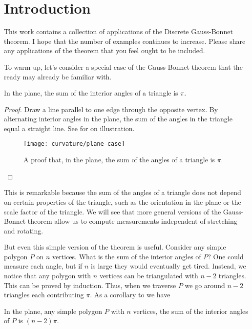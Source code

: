 \section{Introduction}
\label{sec:intro}

This work contains a collection of applications of the 
Discrete Gauss-Bonnet theorem.
I hope that the number of examples continues to increase.
Please share any applications of the theorem that you feel
ought to  be included.


To warm up, let's consider a special case of the Gauss-Bonnet
theorem that the ready may already be familiar with.
\begin{theorem}\label{thm:triangle}
In the plane, the sum of the interior angles of a triangle is $\pi$.
\end{theorem}
\begin{proof}
Draw a line parallel to one edge through the opposite vertex.
By alternating interior angles in the plane, the sum of the angles
in the triangle equal  a straight line.
See  for on illustration. 



\begin{figure}[htb]
\centering
\texttt{[image: curvature/plane-case]}
\caption{A proof that, in the plane, the sum of the angles of a triangle is $\pi$.}
\label{fig:angles}
\end{figure}

\end{proof}

This is remarkable because the sum of the angles of a triangle does not
depend on certain properties of the  triangle, such as the orientation in the plane or
the scale factor of the triangle.
We will see that more general versions of the Gauss-Bonnet theorem allow us 
to compute measurements independent of stretching and rotating.

But even this simple version of the theorem is useful.
Consider any simple polygon $P$ on $n$ vertices. 
What is the sum of the interior angles of $P$?
One could measure each angle, but if $n$ is large they would eventually
get tired.
Instead, we notice that any polygon with $n$ vertices can be
triangulated with $n-2$ triangles. This can be proved by induction.
Thus, when we traverse $P$ we go around $n-2$ triangles each contributing
$\pi$.
As a corollary to  we have
\begin{corollary}\label{cor:angles}
In the plane, any simple polygon $P$ with $n$ vertices,
the sum of the interior angles of $P$ is $(n-2)\pi$.

\end{corollary}






